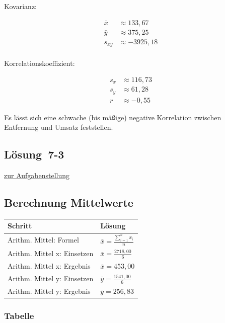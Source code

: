 \documentclass[
  11pt,
  ngerman,
  a4paper,
]{report}
\begin{document}
Kovarianz:

\[\begin{aligned}
\bar{x} &\approx 133{,}67\\
\bar{y} &\approx 375{,}25\\
s_{xy}&\approx -3925{,}18\\
\end{aligned}\]

Korrelationskoeffizient:

\[\begin{aligned}
s_x &\approx 116{,}73\\
s_y &\approx 61{,}28\\
r &\approx -0{,}55
\end{aligned}\]

Es lässt sich eine schwache (bis mäßige) negative Korrelation zwischen Entfernung und Umsatz feststellen.

\hypertarget{loesung-7-3}{%
\subsection{Lösung~7-3}\label{loesung-7-3}}

\protect\hyperlink{aufgabe-7-3}{zur Aufgabenstellung}

\hypertarget{berechnung-mittelwerte}{%
\subsection{Berechnung Mittelwerte}\label{berechnung-mittelwerte}}

\begin{table}[H]
\centering
\begin{tabular}{ll}
\toprule
\textbf{Schritt} & \textbf{Lösung}\\
\midrule
Arithm. Mittel: Formel & $\bar{x}=\frac{\sum\limits_{i=1}^{n}x_{i}}{n}$\\
Arithm. Mittel x: Einsetzen & $\bar{x}=\frac{2718{,}00}{6}$\\
Arithm. Mittel x: Ergebnis & $\bar{x}=453{,}00$\\
Arithm. Mittel y: Einsetzen & $\bar{y}=\frac{1541{,}00}{6}$\\
Arithm. Mittel y: Ergebnis & $\bar{y}=256{,}83$\\
\bottomrule
\end{tabular}
\end{table}

\hypertarget{tabelle}{%
\subsubsection{Tabelle}\label{tabelle}}
\end{document}
